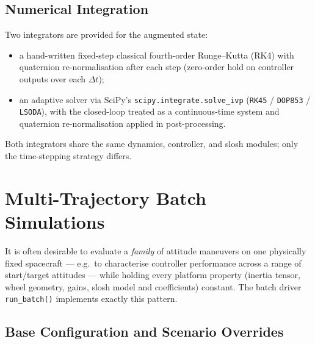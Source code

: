 \subsection{Numerical Integration}
\label{sec:integration}

Two integrators are provided for the augmented state:
\begin{itemize}\setlength{\itemsep}{2pt}
  \item a hand-written fixed-step classical fourth-order Runge--Kutta
        (RK4) with quaternion re-normalisation after each step
        (zero-order hold on controller outputs over each $\Delta t$);
  \item an adaptive solver via SciPy's
        \texttt{scipy.integrate.solve\_ivp}
        (\texttt{RK45} / \texttt{DOP853} / \texttt{LSODA}), with the
        closed-loop treated as a continuous-time system and quaternion
        re-normalisation applied in post-processing.
\end{itemize}
Both integrators share the same dynamics, controller, and slosh
modules; only the time-stepping strategy differs.


\section{Multi-Trajectory Batch Simulations}
\label{sec:batch}

It is often desirable to evaluate a \emph{family} of attitude maneuvers on
one physically fixed spacecraft --- e.g.\ to characterise controller
performance across a range of start/target attitudes --- while holding
every platform property (inertia tensor, wheel geometry, gains, slosh
model and coefficients) constant. The batch driver \texttt{run\_batch()}
implements exactly this pattern.

\subsection{Base Configuration and Scenario Overrides}
\label{sec:batch-config}

